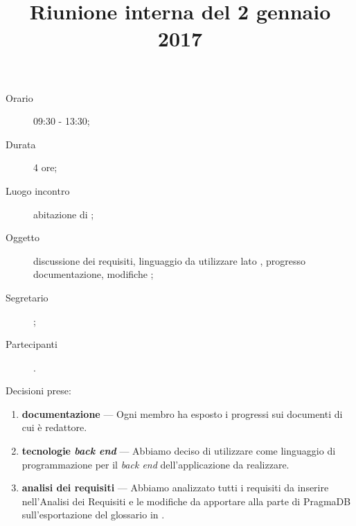 


\author{\PB}
\supervisor{\MM}
\dest{\ALL}
\title{Riunione interna del 2 gennaio 2017}



\maketitle

\begin{description}
	\item[Orario] 09:30 - 13:30;
	\item[Durata] 4 ore;
	\item[Luogo incontro] abitazione di \PB;
	\item[Oggetto] discussione dei requisiti, linguaggio da utilizzare lato , progresso documentazione, modifiche ;
	\item[Segretario] \PB;
	\item[Partecipanti] \ALL.
\end{description}

Decisioni prese:
\begin{enumerate}
	\item \textbf{documentazione} --- Ogni membro ha esposto i progressi sui documenti di cui è redattore.
	\item \textbf{tecnologie \emph{back end}} --- Abbiamo deciso di utilizzare  come linguaggio di programmazione per il \emph{back end} dell'applicazione da realizzare.
	\item \textbf{analisi dei requisiti} --- Abbiamo analizzato tutti i requisiti da inserire nell'Analisi dei Requisiti e le modifiche da apportare alla parte  di PragmaDB sull'esportazione del glossario in .
\end{enumerate}


